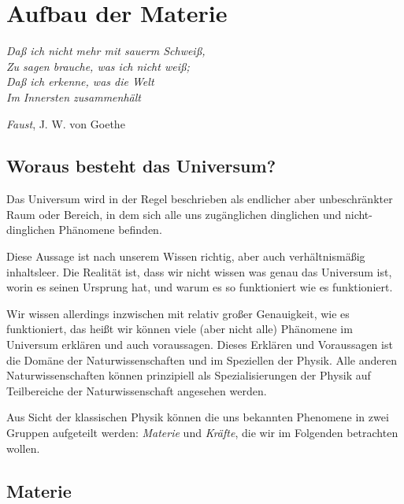 
\chapter{Aufbau der Materie}
\label{chapter-materie}

\begin{displayquote}
\begin{center}
\textit{Daß ich nicht mehr mit sauerm Schweiß,\\
Zu sagen brauche, was ich nicht weiß;\\
Daß ich erkenne, was die Welt\\
Im Innersten zusammenhält}
\end{center}
\begin{flushright}
\textit{Faust}, J. W. von Goethe
\end{flushright}
\end{displayquote}

\section{Woraus besteht das Universum?}

Das Universum wird in der Regel beschrieben als endlicher aber unbeschränkter Raum oder Bereich, in dem sich alle uns zugänglichen dinglichen und nicht-dinglichen Phänomene befinden.

Diese Aussage ist nach unserem Wissen richtig, aber auch verhältnismäßig inhaltsleer. Die Realität ist, dass wir nicht wissen was genau das Universum ist, worin es seinen Ursprung hat, und warum es so funktioniert wie es funktioniert. 

Wir wissen allerdings inzwischen mit relativ großer Genauigkeit, wie es funktioniert, das heißt wir können viele (aber nicht alle) Phänomene im Universum erklären und auch voraussagen. Dieses Erklären und Voraussagen ist die Domäne der Naturwissenschaften und im Speziellen der Physik. Alle anderen Naturwissenschaften können prinzipiell als Spezialisierungen der Physik auf Teilbereiche der Naturwissenschaft angesehen werden.

Aus Sicht der klassischen Physik können die uns bekannten Phenomene in zwei Gruppen aufgeteilt werden: \textit{Materie} und \textit{Kräfte}, die wir im Folgenden betrachten wollen.

\section{Materie}
\lipsum[1]
